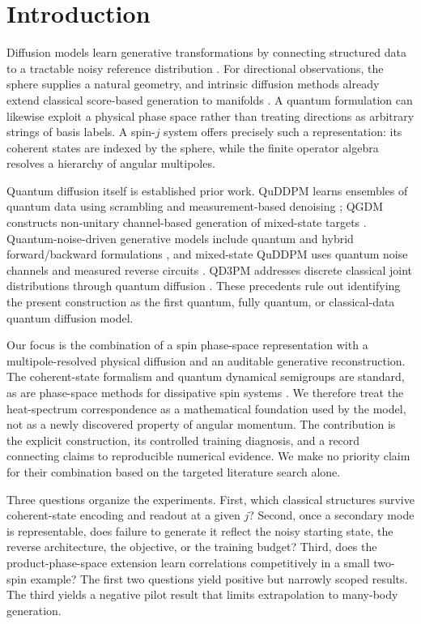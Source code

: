 \section{Introduction}
Diffusion models learn generative transformations by connecting structured data to a tractable noisy reference distribution \citep{ho2020}. For directional observations, the sphere supplies a natural geometry, and intrinsic diffusion methods already extend classical score-based generation to manifolds \citep{debortoli2022}. A quantum formulation can likewise exploit a physical phase space rather than treating directions as arbitrary strings of basis labels. A spin-$j$ system offers precisely such a representation: its coherent states are indexed by the sphere, while the finite operator algebra resolves a hierarchy of angular multipoles.

Quantum diffusion itself is established prior work. QuDDPM learns ensembles of quantum data using scrambling and measurement-based denoising \citep{zhang2024}; QGDM constructs non-unitary channel-based generation of mixed-state targets \citep{chen2026qgdm}. Quantum-noise-driven generative models include quantum and hybrid forward/backward formulations \citep{parigi2024}, and mixed-state QuDDPM uses quantum noise channels and measured reverse circuits \citep{kwun2024}. QD3PM addresses discrete classical joint distributions through quantum diffusion \citep{chen2026qd3pm}. These precedents rule out identifying the present construction as the first quantum, fully quantum, or classical-data quantum diffusion model.

Our focus is the combination of a spin phase-space representation with a multipole-resolved physical diffusion and an auditable generative reconstruction. The coherent-state formalism \citep{arecchi1972} and quantum dynamical semigroups \citep{lindblad1976} are standard, as are phase-space methods for dissipative spin systems \citep{merkel2021}. We therefore treat the heat-spectrum correspondence as a mathematical foundation used by the model, not as a newly discovered property of angular momentum. The contribution is the explicit construction, its controlled training diagnosis, and a record connecting claims to reproducible numerical evidence. We make no priority claim for their combination based on the targeted literature search alone.

Three questions organize the experiments. First, which classical structures survive coherent-state encoding and readout at a given $j$? Second, once a secondary mode is representable, does failure to generate it reflect the noisy starting state, the reverse architecture, the objective, or the training budget? Third, does the product-phase-space extension learn correlations competitively in a small two-spin example? The first two questions yield positive but narrowly scoped results. The third yields a negative pilot result that limits extrapolation to many-body generation.

